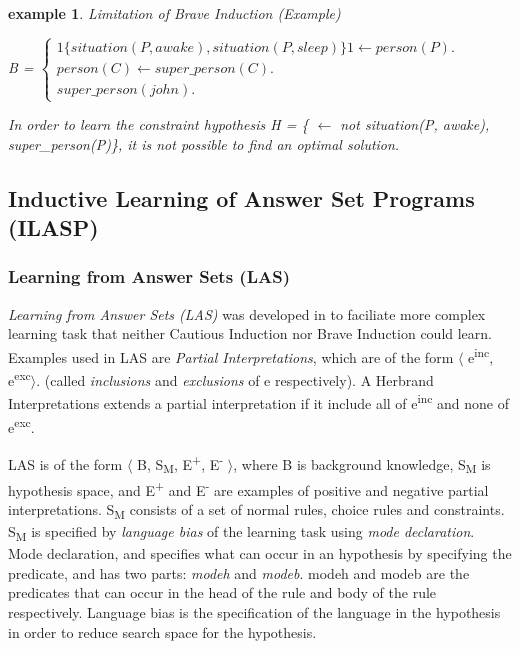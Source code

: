 \documentclass[12pt,twoside]{report}
\newtheorem{examp}{example}[section]
\begin{document}
\begin{examp} \normalfont Limitation of Brave Induction (Example)

B = $\begin{cases}
	1\{situation(P, awake), situation(P, sleep)\}1 \leftarrow person(P). \\
	person(C) \leftarrow super\_person(C). \\
	super\_person(john).
	\end{cases}$

In order to learn the  constraint hypothesis H = \{ $\leftarrow$ not situation(P, awake), super\_person(P)\}, it is not possible to find an optimal solution.
\end{examp}
\label{limitation_brave}

\subsection{Inductive Learning of Answer Set Programs (ILASP)}
\label{section_lasp}

\subsubsection{Learning from Answer Sets (LAS)}
\textit{Learning from Answer Sets (LAS)} was developed in \cite{Law2014} to faciliate more complex learning task that neither Cautious Induction nor Brave Induction could learn.
Examples used in LAS are \textit{Partial Interpretations}, which are of the form $\langle$ e\textsuperscript{inc}, e\textsuperscript{exc}$\rangle$. (called \textit{inclusions} and \textit{exclusions} of e respectively).  A Herbrand Interpretations extends a partial interpretation if it include all of e\textsuperscript{inc} and none of e\textsuperscript{exc}.

LAS is of the form $\langle$ B, S\textsubscript{M}, E\textsuperscript{+}, E\textsuperscript{-} $\rangle$, where B is background knowledge, S\textsubscript{M} is hypothesis space, and E\textsuperscript{+} and E\textsuperscript{-} are examples of positive and negative partial interpretations. S\textsubscript{M} consists of a set of normal rules, choice rules and constraints. S\textsubscript{M} is specified by \textit{language bias} of the learning task using \textit{mode declaration}. Mode declaration, and specifies what can occur in an hypothesis by specifying the predicate, and has two parts: \textit{modeh} and \textit{modeb}.  modeh and modeb are the predicates that can occur in the head of the rule and body of the rule respectively. Language bias is the specification of the language in the hypothesis in order to reduce search space for the hypothesis.
\end{document}
